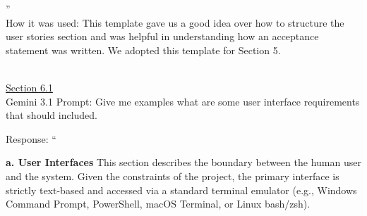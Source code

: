 \documentclass[
]{article}
\begin{document}
''\\
How it was used: This template gave us a good idea over how to structure
the user stories section and was helpful in understanding how an
acceptance statement was written. We adopted this template for Section
5.\\
\strut \\
\ul{Section 6.1}\\
Gemini 3.1 Prompt: Give me examples what are some user interface
requirements that should included.

Response: ``

\textbf{a. User Interfaces} This section describes the boundary between
the human user and the system. Given the constraints of the project, the
primary interface is strictly text-based and accessed via a standard
terminal emulator (e.g., Windows Command Prompt, PowerShell, macOS
Terminal, or Linux bash/zsh).
\end{document}

